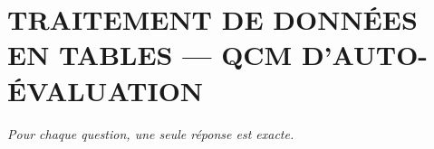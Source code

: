 
\section*{\textcolor{chapcolor}{\MakeUppercase{Traitement de données en tables — QCM d'auto-évaluation}}}

\begin{center}
\textit{Pour chaque question, une seule réponse est exacte.}
\end{center}

